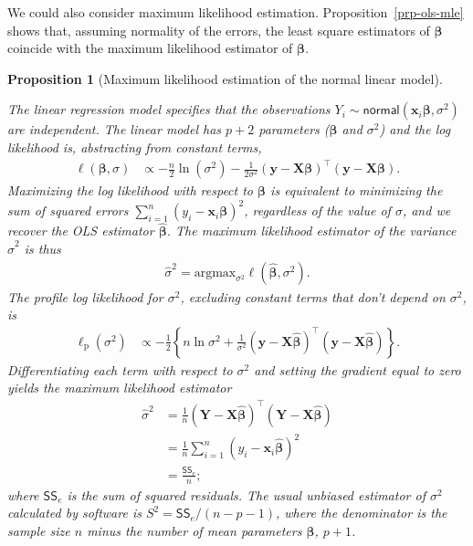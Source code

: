 \documentclass[
  11pt,
  letterpaper,
]{scrbook}
\theoremstyle{plain}
\theoremstyle{definition}
\theoremstyle{definition}
\theoremstyle{plain}
\newtheorem{proposition}{Proposition}[chapter]
\theoremstyle{remark}
\begin{document}
We could also consider maximum likelihood estimation.
Proposition~\ref{prp-ols-mle} shows that, assuming normality of the
errors, the least square estimators of \(\boldsymbol{\beta}\) coincide
with the maximum likelihood estimator of \(\boldsymbol{\beta}\).

\begin{proposition}[Maximum likelihood estimation of the normal linear
model]\protect\hypertarget{prp-mle-normal-linmod}{}\label{prp-mle-normal-linmod}

The linear regression model specifies that the observations
\(Y_i \sim \mathsf{normal}(\mathbf{x}_i\boldsymbol{\beta}, \sigma^2)\)
are independent. The linear model has \(p+2\) parameters
(\(\boldsymbol{\beta}\) and \(\sigma^2\)) and the log likelihood is,
abstracting from constant terms, \begin{align*}
\ell(\boldsymbol{\beta}, \sigma)&\propto-\frac{n}{2} \ln (\sigma^2) -\frac{1}{2\sigma^2}(\boldsymbol{y}-\mathbf{X}\boldsymbol{\beta})^\top(\boldsymbol{y}-\mathbf{X}\boldsymbol{\beta}).
\end{align*} Maximizing the log likelihood with respect to
\(\boldsymbol{\beta}\) is equivalent to minimizing the sum of squared
errors \(\sum_{i=1}^n (y_i - \mathbf{x}_i\boldsymbol{\beta})^2\),
regardless of the value of \(\sigma\), and we recover the OLS estimator
\(\widehat{\boldsymbol{\beta}}\). The maximum likelihood estimator of
the variance \(\widehat{\sigma}^2\) is thus \begin{align*}
\widehat{\sigma}^2=\mathrm{arg max}_{\sigma^2} \ell(\widehat{\boldsymbol{\beta}}, \sigma^2).
\end{align*} The profile log likelihood for \(\sigma^2\), excluding
constant terms that don't depend on \(\sigma^2\), is \begin{align*}
\ell_{\mathrm{p}}(\sigma^2)
&\propto-\frac{1}{2}\left\{n\ln\sigma^2+\frac{1}{\sigma^2}(\boldsymbol{y}-\mathbf{X}\hat{\boldsymbol{\beta}})^\top(\boldsymbol{y}-\mathbf{X}\hat{\boldsymbol{\beta}})\right\}.
\end{align*} Differentiating each term with respect to \(\sigma^2\) and
setting the gradient equal to zero yields the maximum likelihood
estimator \begin{align*}
\widehat{\sigma}^2&=\frac{1}{n}(\boldsymbol{Y}-\mathbf{X}\hat{\boldsymbol{\beta}})^\top(\boldsymbol{Y}-\mathbf{X}\hat{\boldsymbol{\beta}})\\&= \frac{1}{n} \sum_{i=1}^n (y_i - \mathbf{x}_i\widehat{\boldsymbol{\beta}})^2\\&= \frac{\mathsf{SS}_e}{n};
\end{align*} where \(\mathsf{SS}_e\) is the sum of squared residuals.
The usual unbiased estimator of \(\sigma^2\) calculated by software is
\(S^2=\mathsf{SS}_e/(n-p-1)\), where the denominator is the sample size
\(n\) minus the number of mean parameters \(\boldsymbol{\beta}\),
\(p+1\).

\end{proposition}
\end{document}
